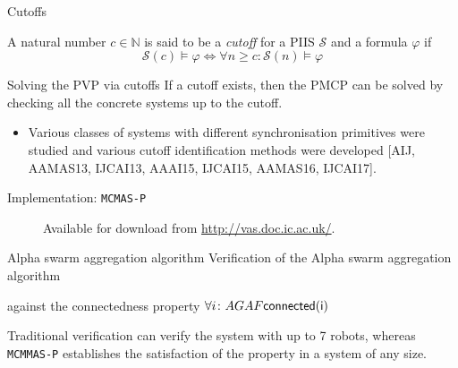 \documentclass[10pt]{beamer}
\begin{document}
\begin{frame}{Cutoffs}
 
\begin{definition}[Cutoff]
A natural number   $c \in \mathbb{N}$ is said to be a \emph{cutoff}
for a PIIS $\mathcal{S}$ and a formula $\varphi$ if
  \[ 
    \mathcal{S}(c) \models \varphi \Leftrightarrow \forall n \geq c \colon 
    \mathcal{S}(n) \models \varphi
 \]
\end{definition}

	\vspace{1em}

\begin{alertblock}{Solving the PVP via cutoffs}
If a cutoff exists, then the PMCP can be solved by checking  all
the concrete systems up to the cutoff.
\end{alertblock}

	\vspace{1em}

\begin{itemize}
	\item Various classes of systems with different synchronisation
		primitives were studied and various cutoff
		identification methods were developed [AIJ, AAMAS13, IJCAI13, AAAI15,
		IJCAI15, AAMAS16, IJCAI17].
\end{itemize}


\end{frame}





\begin{frame}{Implementation: \texttt{MCMAS-P}}

\begin{figure}
\begin{center} 
 
\end{center}
{Available for download from \url{http://vas.doc.ic.ac.uk/}}. 
\end{figure}
\end{frame}




\begin{frame}{Alpha swarm aggregation algorithm}
	Verification of the Alpha swarm aggregation algorithm 
	\begin{center}
  
  \end{center}
  against the connectedness property $\forall i \colon
  AGAF\sf{connected}(i)$


	Traditional verification can verify the system with up to 7
	robots, whereas \texttt{MCMMAS-P} establishes the satisfaction of
	the property in a system of any size.


\end{frame}
\end{document}
